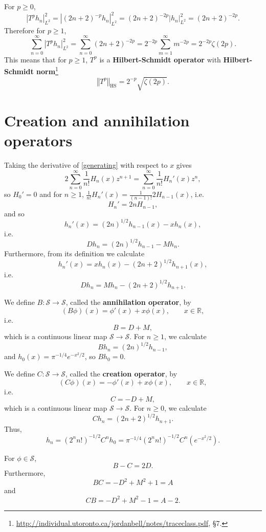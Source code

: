 \documentclass{article}
\newcommand{\HS}[1]{\left\Vert #1 \right\Vert_{\mathrm{HS}}}
\theoremstyle{definition}
\theoremstyle{definition}
\begin{document}
For $p \geq 0$, 
\[
|T^p h_n|_{L^2}^2= |(2n+2)^{-p}h_n|_{L^2}^2
=(2n+2)^{-2p} |h_n|_{L^2}^2
=(2n+2)^{-2p}.
\]
Therefore for $p \geq 1$,
\[
\sum_{n=0}^\infty |T^p h_n|_{L^2}^2 
=\sum_{n=0}^\infty (2n+2)^{-2p}
=2^{-2p} \sum_{m=1}^\infty m^{-2p}
=2^{-2p} \zeta(2p).
\]
This means that for $p \geq 1$, $T^p$ is a \textbf{Hilbert-Schmidt operator} with \textbf{Hilbert-Schmidt norm}\footnote{\url{http://individual.utoronto.ca/jordanbell/notes/traceclass.pdf},
\S 7.}
\[
\HS{T^p} = 2^{-p} \sqrt{\zeta(2p)}.
\]



\section{Creation and annihilation operators}
Taking the derivative of \eqref{generating} with respect to $x$ gives
\[
2\sum_{n=0}^\infty \frac{1}{n!} H_n(x) z^{n+1} = \sum_{n=0}^\infty \frac{1}{n!} H_n'(x) z^n,
\]
so $H_0'=0$ and for $n \geq 1$, $\frac{1}{n!} H_n'(x) = \frac{1}{(n-1)!} 2H_{n-1}(x)$, i.e.
\[
H_n' = 2nH_{n-1},
\]
and so
\[
h_n'(x) = (2n)^{1/2} h_{n-1}(x)-xh_n(x),
\]
i.e.
\[
Dh_n=(2n)^{1/2}h_{n-1}-Mh_n.
\]
Furthermore, from its definition we calculate
\[
h_n'(x) = xh_n(x)-(2n+2)^{1/2} h_{n+1}(x),
\]
i.e.
\[
Dh_n=Mh_n-(2n+2)^{1/2}h_{n+1}.
\]


We define $B:\mathscr{S} \to \mathscr{S}$, called the \textbf{annihilation operator}, by
\[
(B\phi)(x) = \phi'(x)+x\phi(x),\qquad x \in \mathbb{R},
\]
i.e.
\[
B = D+M,
\]
which is a continuous linear map $\mathscr{S} \to \mathscr{S}$.
For $n \geq 1$, we calculate
\[
Bh_n = (2n)^{1/2} h_{n-1},
\]
and $h_0(x)=\pi^{-1/4} e^{-x^2/2}$, so $Bh_0=0$. 



We define $C:\mathscr{S} \to \mathscr{S}$, called the \textbf{creation operator}, by
\[
(C\phi)(x) = -\phi'(x)+x\phi(x),\qquad x \in \mathbb{R},
\]
i.e.
\[
C = -D+M,
\]
which is a continuous linear map $\mathscr{S} \to \mathscr{S}$.
For $n \geq 0$, we calculate
\[
Ch_n = (2n+2)^{1/2}h_{n+1}.
\]
Thus,
\begin{equation}
h_n=(2^nn!)^{-1/2} C^n h_0 =\pi^{-1/4} (2^nn!)^{-1/2} C^n (e^{-x^2/2}).
\label{creation}
\end{equation}

For $\phi \in \mathscr{S}$,
\[
B-C=2D.
\]
Furthermore,
\[
BC = -D^2+M^2+1=A
\]
and
\[
CB = -D^2+M^2-1=A-2.
\]
\end{document}
